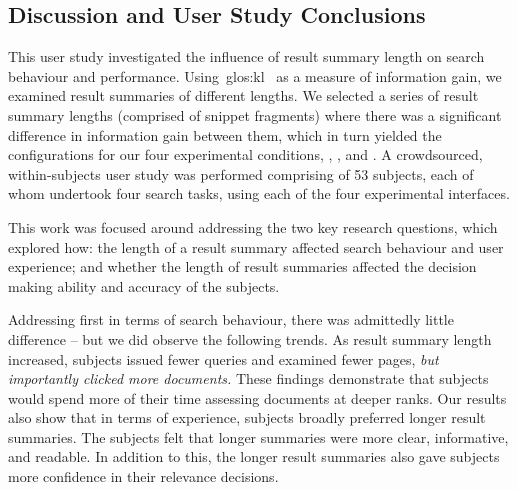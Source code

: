 \subsection{Discussion and User Study Conclusions}\label{chap:snippets:user:discussion}
This user study investigated the influence of result summary length on search behaviour and performance. Using~\gls{glos:kl}~\citep{kullback1951information} as a measure of information gain, we examined result summaries of different lengths. We selected a series of result summary lengths (comprised of snippet fragments) where there was a significant difference in information gain between them, which in turn yielded the configurations for our four experimental conditions, , ,  and . A crowdsourced, within-subjects user study was performed comprising of 53 subjects, each of whom undertook four search tasks, using each of the four experimental interfaces.

This work was focused around addressing the two key research questions, which explored how:  the length of a result summary affected search behaviour and user experience; and  whether the length of result summaries affected the decision making ability and accuracy of the subjects.

Addressing  first in terms of search behaviour, there was admittedly little difference -- but we did observe the following trends. As result summary length increased, subjects issued fewer queries and examined fewer pages, \emph{but importantly clicked more documents.} These findings demonstrate that subjects would spend more of their time assessing documents at deeper ranks. Our results also show that in terms of experience, subjects broadly preferred longer result summaries. The subjects felt that longer summaries were more clear, informative, and readable. In addition to this, the longer result summaries also gave subjects more confidence in their relevance decisions.


